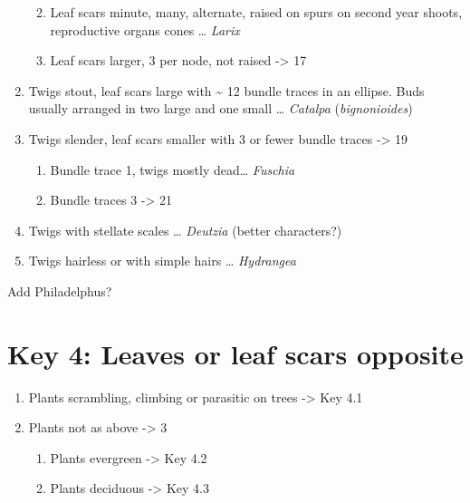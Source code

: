 \documentclass[openany]{book}
\providecommand{\tightlist}{%
  \setlength{\itemsep}{0pt}\setlength{\parskip}{0pt}}
\begin{document}
\begin{enumerate}
  \begin{enumerate}
  \def\labelenumii{\arabic{enumii}.}
  \setcounter{enumii}{14}
  \tightlist
  \item
    Leaf scars minute, many, alternate, raised on spurs on second year
    shoots, reproductive organs cones \ldots{} \emph{Larix}
  \item
    Leaf scars larger, 3 per node, not raised -\textgreater{} 17
  \end{enumerate}
\item
  Twigs stout, leaf scars large with \textasciitilde{} 12 bundle traces
  in an ellipse. Buds usually arranged in two large and one small
  \ldots{} \emph{Catalpa} (\emph{bignonioides})
\item
  Twigs slender, leaf scars smaller with 3 or fewer bundle traces
  -\textgreater{} 19

  \begin{enumerate}
  \def\labelenumii{\arabic{enumii}.}
  \setcounter{enumii}{18}
  \tightlist
  \item
    Bundle trace 1, twigs mostly dead\ldots{} \emph{Fuschia}
  \item
    Bundle traces 3 -\textgreater{} 21
  \end{enumerate}
\item
  Twigs with stellate scales \ldots{} \emph{Deutzia} (better
  characters?)
\item
  Twigs hairless or with simple hairs \ldots{} \emph{Hydrangea}
\end{enumerate}

Add Philadelphus?

\hypertarget{key-4-leaves-or-leaf-scars-opposite}{%
\chapter{Key 4: Leaves or leaf scars
opposite}\label{key-4-leaves-or-leaf-scars-opposite}}

\begin{enumerate}
\def\labelenumi{\arabic{enumi}.}
\tightlist
\item
  Plants scrambling, climbing or parasitic on trees -\textgreater{} Key
  4.1
\item
  Plants not as above -\textgreater{} 3

  \begin{enumerate}
  \def\labelenumii{\arabic{enumii}.}
  \setcounter{enumii}{2}
  \tightlist
  \item
    Plants evergreen -\textgreater{} Key 4.2
  \item
    Plants deciduous -\textgreater{} Key 4.3
  \end{enumerate}
\end{enumerate}
\end{document}
